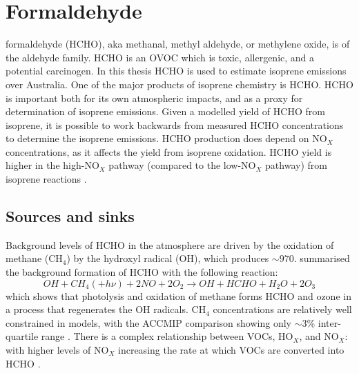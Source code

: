     
\section{Formaldehyde}
\label{LR:HCHO}

  formaldehyde (HCHO), aka methanal, methyl aldehyde, or methylene oxide, is of the aldehyde family.
  HCHO is an OVOC which is toxic, allergenic, and a potential carcinogen.
  In this thesis HCHO is used to estimate isoprene emissions over Australia.
  One of the major products of isoprene chemistry is HCHO.
  HCHO is important both for its own atmospheric impacts, and as a proxy for determination of isoprene emissions.
  Given a modelled yield of HCHO from isoprene, it is possible to work backwards from measured HCHO concentrations to determine the isoprene emissions.
  HCHO production does depend on NO$_X$ concentrations, as it affects the yield from isoprene oxidation.
  HCHO yield is higher in the high-NO$_X$ pathway (compared to the low-NO$_X$ pathway) from isoprene reactions \parencite{Marais2012}.
  
  

  
  \subsection{Sources and sinks}
    \label{LR:HCHO:Sources}
     
    Background levels of HCHO in the atmosphere are driven by the oxidation of methane (CH$_4$) by the hydroxyl radical (OH$\dot{}$), which produces $\sim 970$\tgpyr \parencite{FortemsCheiney2012}.
    \textcite{Atkinson2000} summarised the background formation of HCHO with the following reaction:
    \begin{equation*} \label{LR:HCHO:Sources:eqn_MethaneBackground}
      OH + CH_4 (+ h\nu) + 2NO + 2O_2 \rightarrow OH + HCHO + H_2O + 2O_3
    \end{equation*}
    which shows that photolysis and oxidation of methane forms HCHO and ozone in a process that regenerates the OH radicals.
    CH$_4$ concentrations are relatively well constrained in models, with the ACCMIP comparison showing only $\sim3$\% inter-quartile range \parencite{Young2013}.
    There is a complex relationship between VOCs, HO$_X$, and NO$_X$: with higher levels of NO$_X$ increasing the rate at which VOCs are converted into HCHO \parencite{Wolfe2016}.
    
